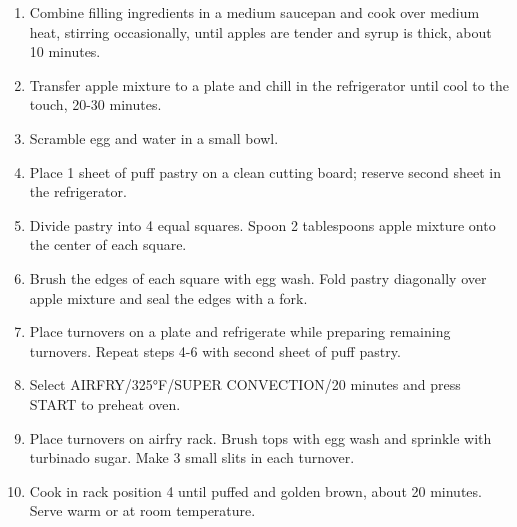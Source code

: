 \begin{enumerate}
  \item Combine filling ingredients in a medium saucepan and cook over medium heat, stirring occasionally, until apples are tender and syrup is thick, about 10 minutes.
  \item Transfer apple mixture to a plate and chill in the refrigerator until cool to the touch, 20-30 minutes.
  \item Scramble egg and water in a small bowl.
  \item Place 1 sheet of puff pastry on a clean cutting board; reserve second sheet in the refrigerator.
  \item Divide pastry into 4 equal squares. Spoon 2 tablespoons apple mixture onto the center of each square.
  \item Brush the edges of each square with egg wash. Fold pastry diagonally over apple mixture and seal the edges with a fork.
  \item Place turnovers on a plate and refrigerate while preparing remaining turnovers. Repeat steps 4-6 with second sheet of puff pastry.
  \item Select AIRFRY/325°F/SUPER CONVECTION/20 minutes and press START to preheat oven.
  \item Place turnovers on airfry rack. Brush tops with egg wash and sprinkle with turbinado sugar. Make 3 small slits in each turnover.
  \item Cook in rack position 4 until puffed and golden brown, about 20 minutes. Serve warm or at room temperature.
\end{enumerate}

